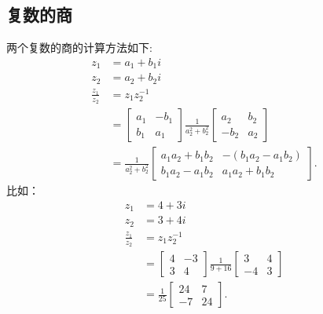 \subsection{复数的商}
两个复数的商的计算方法如下:
$$
  \begin{aligned}
    z_{1}               & =a_{1}+b_{1} i                                                                                                  \\
    z_{2}               & =a_{2}+b_{2} i                                                                                                  \\
    \frac{z_{1}}{z_{2}} & =z_{1} z_{2}^{-1}                                                                                               \\
                        & =\left[\begin{array}{cc}
        a_{1} & -b_{1} \\
        b_{1} & a_{1}
      \end{array}\right] \frac{1}{a_{2}^{2}+b_{2}^{2}}\left[\begin{array}{cc}
        a_{2}  & b_{2} \\
        -b_{2} & a_{2}
      \end{array}\right] \\
                        & =\frac{1}{a_{2}^{2}+b_{2}^{2}}\left[\begin{array}{cc}
        a_{1} a_{2}+b_{1} b_{2} & -\left(b_{1} a_{2}-a_{1} b_{2}\right) \\
        b_{1} a_{2}-a_{1} b_{2} & a_{1} a_{2}+b_{1} b_{2}
      \end{array}\right] .
  \end{aligned}
$$
比如：
$$
  \begin{aligned}
    z_{1}               & =4+3 i                                                                                           \\
    z_{2}               & =3+4 i                                                                                           \\
    \frac{z_{1}}{z_{2}} & =z_{1} z_{2}^{-1}                                                                                \\
                        & =\left[\begin{array}{cc}
        4 & -3 \\
        3 & 4
      \end{array}\right] \frac{1}{9+16}\left[\begin{array}{cc}
        3  & 4 \\
        -4 & 3
      \end{array}\right] \\
                        & =\frac{1}{25}\left[\begin{array}{cc}
        24 & 7  \\
        -7 & 24
      \end{array}\right] .
  \end{aligned}
$$

